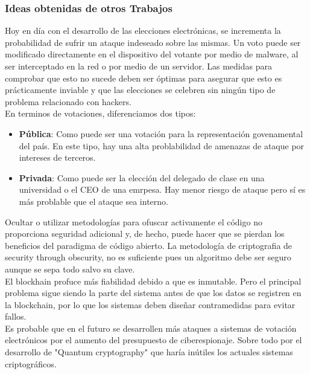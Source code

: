 \documentclass{article}
\begin{document}
\subsubsection{Ideas obtenidas de otros Trabajos}                
   Hoy en día con el desarrollo de las elecciones electrónicas, se incrementa la probabilidad de sufrir un ataque indeseado sobre las mismas. Un voto puede ser modificado directamente en el dispositivo del votante por medio de malware, al ser interceptado en la red o por medio de un servidor. Las medidas para comprobar que esto no sucede deben ser óptimas para asegurar que esto es prácticamente inviable y que las elecciones se celebren sin ningún tipo de problema relacionado con hackers.\\

   En terminos de votaciones, diferenciamos dos tipos:
   \begin{itemize}
   \item \textbf{Pública}: Como puede ser una votación para la representación govenamental del país. En este tipo, hay una alta problabilidad de amenazas de ataque por intereses de terceros. 
   \item \textbf{Privada}: Como puede ser la elección del delegado de clase en una universidad o el CEO de una emrpesa. Hay menor riesgo de ataque pero sí es más problable que el ataque sea interno.
   \end{itemize}

 Ocultar o utilizar metodologías para ofuscar activamente el código no proporciona seguridad adicional y, de hecho, puede hacer que se pierdan los beneficios del paradigma de código abierto. La metodología de criptografia de security through obscurity, no es suficiente pues un algoritmo debe ser seguro aunque se sepa todo salvo su clave.\\

 El blockhain profuce más fiabilidad debido a que es inmutable. Pero el principal problema sigue siendo la parte del sistema antes de que los datos se registren en la blockchain, por lo que los sistemas deben diseñar contramedidas para evitar fallos.\\
	
Es probable que en el futuro se desarrollen más ataques a sistemas de votación electrónicos por el aumento del presupuesto de ciberespionaje. Sobre todo por el desarrollo de "Quantum cryptography" que haría inútiles los actuales sistemas criptográficos. 
\end{document}
